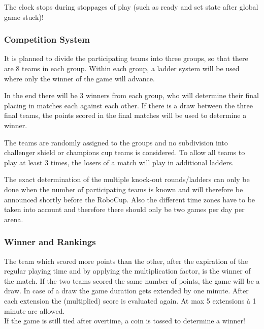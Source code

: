 The clock stops during stoppages of play (such as ready and set state after global game stuck)!

\subsubsection{Competition System}
It is planned to divide the participating teams into three groups, so that there are 8 teams in each group. Within each group, a ladder system will be used where only the winner of the game will advance. 

In the end there will be 3 winners from each group, who will determine their final placing in matches each against each other. If there is a draw between the three final teams, the points scored in the final matches will be used to determine a winner.

The teams are randomly assigned to the groups and no subdivision into challenger shield or champions cup teams is considered.
To allow all teams to play at least 3 times, the losers of a match will play in additional ladders.

The exact determination of the multiple knock-out rounds/ladders can only be done when the number of participating teams is known and will therefore be announced shortly before the RoboCup. Also the different time zones have to be taken into account and therefore there should only be two games per day per arena.
    
\subsubsection{Winner and Rankings}
\label{sec:rankings}

The team which scored more points than the other, after the expiration of the regular playing time and by applying the multiplication factor, is the winner of the match. If the two teams scored the same number of points, the game will be a draw. In case of a draw the game duration gets extended by one minute. After each extension the (multiplied) score is evaluated again. At max 5 extensions à 1 minute are allowed. \\
If the game is still tied after overtime, a coin is tossed to determine a winner!    
